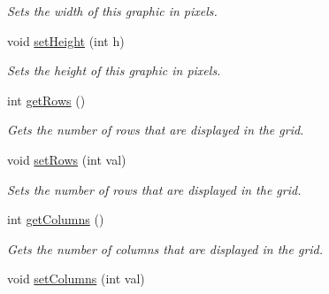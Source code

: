 \begin{DoxyCompactItemize}
\begin{DoxyCompactList}\small\item\em Sets the width of this graphic in pixels. \end{DoxyCompactList}\item 
\hypertarget{class_picto_1_1_grid_graphic_a48641e56f4b4cc51869f3144e8054c6c}{void \hyperlink{class_picto_1_1_grid_graphic_a48641e56f4b4cc51869f3144e8054c6c}{set\-Height} (int h)}\label{class_picto_1_1_grid_graphic_a48641e56f4b4cc51869f3144e8054c6c}

\begin{DoxyCompactList}\small\item\em Sets the height of this graphic in pixels. \end{DoxyCompactList}\item 
\hypertarget{class_picto_1_1_grid_graphic_aea61b1e4d3165d899d6a77c1cf0fe341}{int \hyperlink{class_picto_1_1_grid_graphic_aea61b1e4d3165d899d6a77c1cf0fe341}{get\-Rows} ()}\label{class_picto_1_1_grid_graphic_aea61b1e4d3165d899d6a77c1cf0fe341}

\begin{DoxyCompactList}\small\item\em Gets the number of rows that are displayed in the grid. \end{DoxyCompactList}\item 
\hypertarget{class_picto_1_1_grid_graphic_a53a92833a8563c17b23d12f0bc09897d}{void \hyperlink{class_picto_1_1_grid_graphic_a53a92833a8563c17b23d12f0bc09897d}{set\-Rows} (int val)}\label{class_picto_1_1_grid_graphic_a53a92833a8563c17b23d12f0bc09897d}

\begin{DoxyCompactList}\small\item\em Sets the number of rows that are displayed in the grid. \end{DoxyCompactList}\item 
\hypertarget{class_picto_1_1_grid_graphic_a04443584df0526bc1ab8a927e126a357}{int \hyperlink{class_picto_1_1_grid_graphic_a04443584df0526bc1ab8a927e126a357}{get\-Columns} ()}\label{class_picto_1_1_grid_graphic_a04443584df0526bc1ab8a927e126a357}

\begin{DoxyCompactList}\small\item\em Gets the number of columns that are displayed in the grid. \end{DoxyCompactList}\item 
\hypertarget{class_picto_1_1_grid_graphic_aa7e3eaf679800fdc32eff31d133a033a}{void \hyperlink{class_picto_1_1_grid_graphic_aa7e3eaf679800fdc32eff31d133a033a}{set\-Columns} (int val)}\label{class_picto_1_1_grid_graphic_aa7e3eaf679800fdc32eff31d133a033a}


\end{DoxyCompactItemize}
